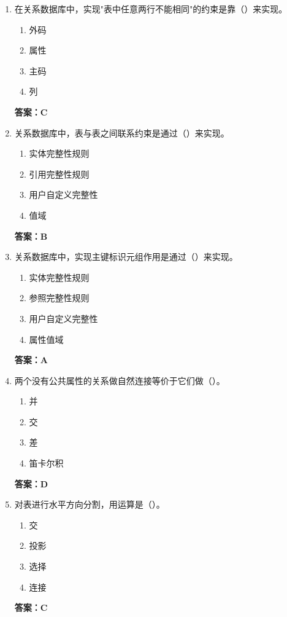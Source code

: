 \documentclass[12pt, a4paper]{article}
\begin{document}
\begin{enumerate}[label=\arabic*.]
	\item 在关系数据库中，实现"表中任意两行不能相同"的约束是靠（\quad）来实现。
	      \begin{enumerate}
		      \item 外码
		      \item 属性
		      \item 主码
		      \item 列
	      \end{enumerate}
	      \textbf{答案：C}

	\item 关系数据库中，表与表之间联系约束是通过（\quad）来实现。
	      \begin{enumerate}
		      \item 实体完整性规则
		      \item 引用完整性规则
		      \item 用户自定义完整性
		      \item 值域
	      \end{enumerate}
	      \textbf{答案：B}

	\item 关系数据库中，实现主键标识元组作用是通过（\quad）来实现。
	      \begin{enumerate}
		      \item 实体完整性规则
		      \item 参照完整性规则
		      \item 用户自定义完整性
		      \item 属性值域
	      \end{enumerate}
	      \textbf{答案：A}

	\item 两个没有公共属性的关系做自然连接等价于它们做（\quad）。
	      \begin{enumerate}
		      \item 并
		      \item 交
		      \item 差
		      \item 笛卡尔积
	      \end{enumerate}
	      \textbf{答案：D}

	\item 对表进行水平方向分割，用运算是（\quad）。
	      \begin{enumerate}
		      \item 交
		      \item 投影
		      \item 选择
		      \item 连接
	      \end{enumerate}
	      \textbf{答案：C}


\end{enumerate}
\end{document}
